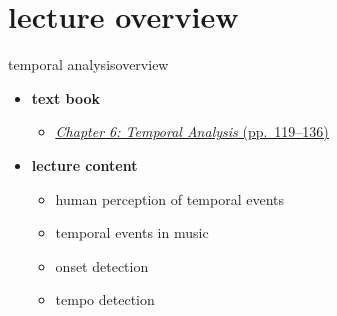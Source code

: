 

\subtitle{Part 7.1: Temporal Analysis}


	

    \section[overview]{lecture overview}
        \begin{frame}{temporal analysis}{overview}
            \begin{itemize}
                \item   \textbf{text book}  
                    \begin{itemize}
                        \item   \href{http://ieeexplore.ieee.org/xpl/articleDetails.jsp?tp=&arnumber=6331123&}{\underline{\textit{Chapter 6: Temporal Analysis} (pp.~119--136)}}
                    \end{itemize}
                \bigskip
                \item<2->   \textbf{lecture content}
                    \begin{itemize}
                        \item<2->   human perception of temporal events
                        \item<3->   temporal events in music
                        \item<4->   onset detection
                        \item<5->   tempo detection
                    \end{itemize}
            \end{itemize}
        \end{frame}

